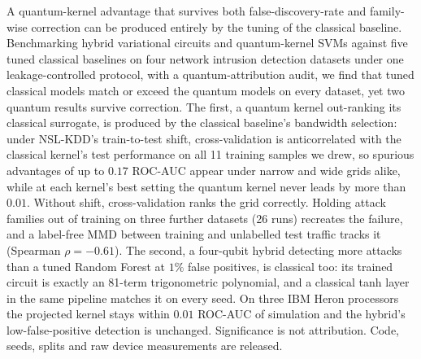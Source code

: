 A quantum-kernel advantage that survives both false-discovery-rate and family-wise correction can be
produced entirely by the tuning of the classical baseline. Benchmarking hybrid variational circuits and
quantum-kernel SVMs against five tuned classical baselines on four network intrusion detection datasets under one leakage-controlled protocol, with a quantum-attribution audit, we find that
tuned classical models match or exceed the quantum models on every dataset, yet two quantum results
survive correction. The first, a quantum kernel out-ranking its classical surrogate, is produced by the
classical baseline's bandwidth selection: under NSL-KDD's train-to-test shift, cross-validation is
anticorrelated with the classical kernel's test performance on all 11 training samples we drew, so
spurious advantages of up to $0.17$ ROC-AUC appear under narrow and wide grids alike, while at each
kernel's best setting the quantum kernel never leads by more than $0.01$. Without shift, cross-validation
ranks the grid correctly. Holding attack families out of training on three further datasets (26 runs)
recreates the failure, and a label-free MMD between training and unlabelled test traffic tracks it
(Spearman $\rho=-0.61$). The second, a four-qubit hybrid detecting more attacks than a tuned Random Forest
at $1\%$ false positives, is classical too: its trained circuit is exactly an 81-term trigonometric
polynomial, and a classical tanh layer in the same pipeline matches it on every seed. On three IBM Heron
processors the projected kernel stays within $0.01$ ROC-AUC of simulation and the hybrid's
low-false-positive detection is unchanged. Significance is not attribution. Code, seeds, splits and raw
device measurements are released.
